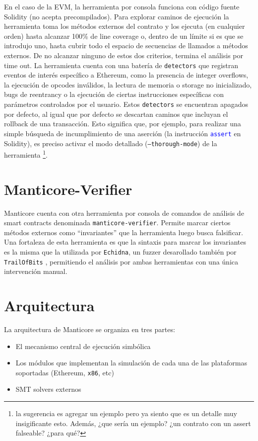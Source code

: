 En el caso de la EVM, la herramienta por consola funciona con código fuente Solidity (no acepta precompilados).
Para explorar caminos de ejecución la herramienta toma los métodos externos del contrato y los ejecuta (en cualquier orden) hasta alcanzar 100\% de line coverage o, dentro de un límite si es que se introdujo uno, hasta cubrir todo el espacio de secuencias de llamados a métodos externos.
De no alcanzar ninguno de estos dos criterios, termina el análisis por time out.
La herramienta cuenta con una batería de \texttt{detectors} que registran eventos de  interés específico a Ethereum, como la presencia de integer overflows, la ejecución de opcodes inválidos, la lectura de memoria o storage no inicializado, bugs de reentrancy o la ejecución de ciertas instrucciones específicas con parámetros controlados por el usuario.
Estos \texttt{detectors} se encuentran apagados por defecto, al igual que por defecto se descartan caminos que incluyan el rollback de una transacción.
Esto significa que, por ejemplo, para realizar una simple búsqueda de incumplimiento de una aserción (la instrucción \textcolor{blue}{\texttt{assert}} en Solidity), es preciso activar el modo detallado (\texttt{--thorough-mode}) de la herramienta \footnote{la sugerencia es agregar un ejemplo pero ya siento que es un detalle muy insigificante esto. Además, ¿que sería un ejemplo? ¿un contrato con un assert falseable? ¿para qué? }.

\section{Manticore-Verifier}
Manticore cuenta con otra herramienta por consola de comandos de análisis de smart contracts denominada \texttt{manticore-verifier}.
Permite marcar ciertos métodos externos como ``invariantes'' que la herramienta luego busca falsificar.
Una fortaleza de esta herramienta es que la sintaxis para marcar los invariantes es la misma que la utilizada por \texttt{Echidna}, un fuzzer desarollado también por \texttt{TrailOfBits} \cite{echidna}, permitiendo el análisis por ambas herramientas con una única intervención manual.

\section{Arquitectura}
La arquitectura de Manticore se organiza en tres partes:
\begin{itemize}
    \item El mecanismo central de ejecución simbólica
    \item Los módulos que implementan la simulación de cada una de las plataformas soportadas (Ethereum, \texttt{x86}, etc)
    \item SMT solvers externos
\end{itemize}

